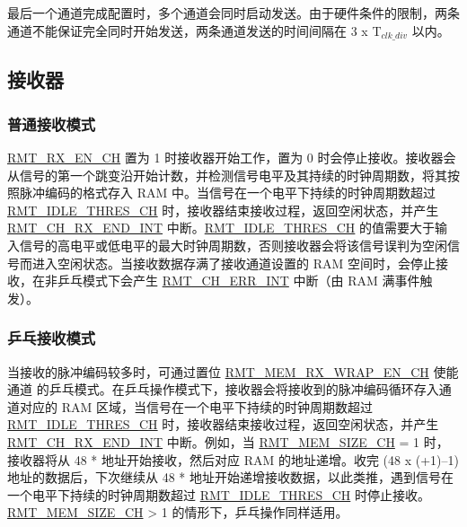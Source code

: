 \documentclass[main\_\_CN.tex]{subfiles}
\begin{document}
最后一个通道完成配置时，多个通道会同时启动发送。由于硬件条件的限制，两条通道不能保证完全同时开始发送，两条通道发送的时间间隔在 3 x T$_{clk\_div}$ 以内。


\subsection{接收器}

\subsubsection{普通接收模式}

\hyperref[fielddesc:RMTRXENCHM]{RMT\_RX\_EN\_CH} 置为 1 时接收器开始工作，置为 0 时会停止接收。接收器会从信号的第一个跳变沿开始计数，并检测信号电平及其持续的时钟周期数，将其按照脉冲编码的格式存入 RAM 中。当信号在一个电平下持续的时钟周期数超过 \hyperref[fielddesc:RMTIDLETHRESCHM]{RMT\_IDLE\_THRES\_CH} 时，接收器结束接收过程，返回空闲状态，并产生 \hyperref[int:RMTCHMRXENDINT]{RMT\_CH\_RX\_END\_INT} 中断。\hyperref[fielddesc:RMTIDLETHRESCHM]{RMT\_IDLE\_THRES\_CH} 的值需要大于输入信号的高电平或低电平的最大时钟周期数，否则接收器会将该信号误判为空闲信号而进入空闲状态。当接收数据存满了接收通道设置的 RAM 空间时，会停止接收，在非乒乓模式下会产生 \hyperref[int:RMTCHNERRINT]{RMT\_CH\_ERR\_INT} 中断（由 RAM 满事件触发）。


\subsubsection{乒乓接收模式}

当接收的脉冲编码较多时，可通过置位 \hyperref[fielddesc:RMTMEMRXWRAPENCHM]{RMT\_MEM\_RX\_WRAP\_EN\_CH} 使能通道  的乒乓模式。在乒乓操作模式下，接收器会将接收到的脉冲编码循环存入通道对应的 RAM 区域，当信号在一个电平下持续的时钟周期数超过 \hyperref[fielddesc:RMTIDLETHRESCHM]{RMT\_IDLE\_THRES\_CH} 时，接收器结束接收过程，返回空闲状态，并产生 \hyperref[int:RMTCHMRXENDINT]{RMT\_CH\_RX\_END\_INT} 中断。例如，当 \hyperref[fielddesc:RMTMEMSIZECHM]{RMT\_MEM\_SIZE\_CH} = 1 时，接收器将从 48 *  地址开始接收，然后对应 RAM 的地址递增。收完 (48 x (+1)$–$1) 地址的数据后，下次继续从 48 *  地址开始递增接收数据，以此类推，遇到信号在一个电平下持续的时钟周期数超过 \hyperref[fielddesc:RMTIDLETHRESCHM]{RMT\_IDLE\_THRES\_CH} 时停止接收。\hyperref[fielddesc:RMTMEMSIZECHM]{RMT\_MEM\_SIZE\_CH} > 1 的情形下，乒乓操作同样适用。
\end{document}
